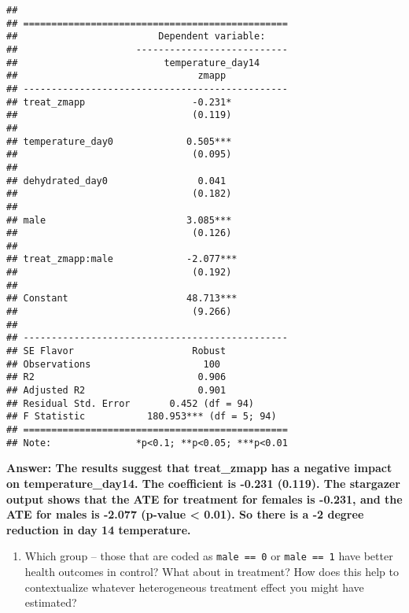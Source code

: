 \documentclass[
]{article}
\providecommand{\tightlist}{%
  \setlength{\itemsep}{0pt}\setlength{\parskip}{0pt}}
\begin{document}
\begin{verbatim}
## 
## ===============================================
##                         Dependent variable:    
##                     ---------------------------
##                          temperature_day14     
##                                zmapp           
## -----------------------------------------------
## treat_zmapp                   -0.231*          
##                               (0.119)          
##                                                
## temperature_day0             0.505***          
##                               (0.095)          
##                                                
## dehydrated_day0                0.041           
##                               (0.182)          
##                                                
## male                         3.085***          
##                               (0.126)          
##                                                
## treat_zmapp:male             -2.077***         
##                               (0.192)          
##                                                
## Constant                     48.713***         
##                               (9.266)          
##                                                
## -----------------------------------------------
## SE Flavor                     Robust           
## Observations                    100            
## R2                             0.906           
## Adjusted R2                    0.901           
## Residual Std. Error       0.452 (df = 94)      
## F Statistic           180.953*** (df = 5; 94)  
## ===============================================
## Note:               *p<0.1; **p<0.05; ***p<0.01
\end{verbatim}

\textbf{Answer: The results suggest that treat\_zmapp has a negative
impact on temperature\_day14. The coefficient is -0.231 (0.119). The
stargazer output shows that the ATE for treatment for females is -0.231,
and the ATE for males is -2.077 (p-value \textless{} 0.01). So there is
a -2 degree reduction in day 14 temperature.}

\begin{enumerate}
\def\labelenumi{\arabic{enumi}.}
\setcounter{enumi}{6}
\tightlist
\item
  Which group -- those that are coded as \texttt{male\ ==\ 0} or
  \texttt{male\ ==\ 1} have better health outcomes in control? What
  about in treatment? How does this help to contextualize whatever
  heterogeneous treatment effect you might have estimated?
\end{enumerate}
\end{document}
